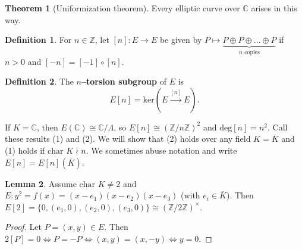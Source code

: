 \documentclass{article}
\theoremstyle{definition}
\newtheorem{theorem}{Theorem}[section]
\newtheorem{lemma}[theorem]{Lemma}
\newtheorem{defn}{Definition}[section]
\begin{document}
\begin{theorem}[Uniformization theorem]
    Every elliptic curve over $\mathbb{C}$ arises in this way.
\end{theorem}
\begin{defn}
    For $n \in \mathbb{Z}$, let $[n]: E \to E$ be given by $P \mapsto \underbrace{P\oplus P \oplus \ldots \oplus P}_{n\text{ copies}}$ if $n>0$ and $[-n] = [-1] \circ [n]$.
\end{defn}
\begin{defn}
    The \textbf{$n$--torsion subgroup} of $E$ is \[
    E[n] = \text{ker}(E \stackrel{[n]}{\longrightarrow} E).
    \]
\end{defn}
If $K=\mathbb{C}$, then $E(\mathbb{C}) \cong \mathbb{C}/\Lambda$, so $E[n] \cong (\mathbb{Z}/n\mathbb{Z})^2$ and $\text{deg}[n] = n^2$. Call these results (1) and (2). We will show that (2) holds over any field $K = \overline{K}$ and (1) holds if $\text{char }K \nmid n$. We sometimes abuse notation and write $E[n] = E[n](\overline{K})$.
\begin{lemma}\label{lemma4.6}
    Assume $\text{char }K \neq 2$ and $E: y^2=f(x)=(x-e_1)(x-e_2)(x-e_3)$ (with $e_i \in \overline{K}$). Then $E[2] = \{0, (e_1,0), (e_2,0), (e_3,0)\} \cong (\mathbb{Z}/2\mathbb{Z})^\times$.
\end{lemma}
\begin{proof}
    Let $P = (x,y) \in E$. Then $2[P] = 0 \iff P = -P \iff (x,y) = (x,-y) \iff y=0$.
\end{proof}
\end{document}

